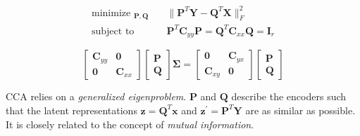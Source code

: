 \documentclass[aspectratio=169, usenames, dvipsnames]{beamer}
\DeclareMathOperator*{\minimize}{minimize~}
\DeclareMathOperator*{\subto}{subject~to~}
\begin{document}
\begin{frame}
  \vfill
  \Large
  \[
  \begin{aligned}
    \minimize_{\bm{P}, \bm{Q}} & \quad \| \bm{P}^T \bm{Y} - \bm{Q}^T \bm{X} \|_F^2 \\
    \subto & \quad \bm{P}^T \bm{C}_{yy} \bm{P} = \bm{Q}^T \bm{C}_{xx} \bm{Q} = \bm{I}_r
  \end{aligned}
  \]
  \vfill
\end{frame}

\begin{frame}

  \vfill

    \begin{tcolorbox}[
      enhanced,
      coltitle=black,
      coltext=white,
      colback=black,
      title=\textbf{Canonical Correlation Analysis},
      frame style tile={width=\paperwidth}{background.jpg}
      ]

      \medskip

      \Large

      \[
      \begin{bmatrix}
        \bm{C}_{yy} & \bm{0} \\
        \bm{0} & \bm{C}_{xx}
      \end{bmatrix}
      \begin{bmatrix}
        \bm{P} \\ \bm{Q}
      \end{bmatrix}
      \boldsymbol{\Sigma}
      =
      \begin{bmatrix}
        \bm{0} & \bm{C}_{yx} \\
        \bm{C}_{xy} & \bm{0}
      \end{bmatrix}
      \begin{bmatrix}
        \bm{P} \\ \bm{Q}
      \end{bmatrix}
      \]

      \medskip
    \end{tcolorbox}

    \vfill

    CCA relies on a \emph{generalized eigenproblem}.
    $\bm{P}$ and $\bm{Q}$ describe the encoders such that the latent representations $\bm{z} = \bm{Q}^T \bm{x}$ and $\bm{z}^{\prime} = \bm{P}^T \bm{Y}$ are as similar as possible.
    It is closely related to the concept of \emph{mutual information}.

    \vfill
\end{frame}
\end{document}
